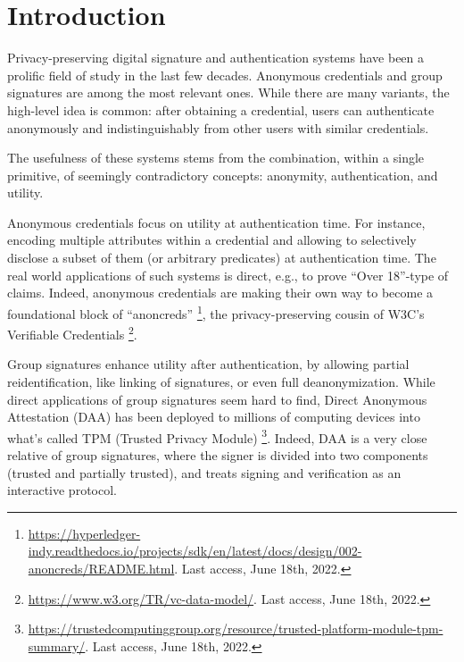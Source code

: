 \section{Introduction}
\label{sec:introduction}


Privacy-preserving digital signature and authentication systems have been a
prolific field of study in the last few decades. Anonymous credentials
\cite{chau85} and group signatures \cite{ch91} are among the most relevant ones.
While there are many variants, the high-level idea is common: after obtaining a
credential, users can authenticate anonymously and indistinguishably from other
users with similar credentials. 

The usefulness of these systems stems from the combination, within a single
primitive, of seemingly contradictory concepts: anonymity, authentication, and
utility.

Anonymous credentials focus on utility at authentication time. For
instance, encoding multiple attributes within a credential and allowing to
selectively disclose a subset of them (or arbitrary predicates) at
authentication time. The real world applications of such systems is direct,
e.g., to prove ``Over 18''-type of claims. Indeed, anonymous credentials are
making their own way to become a foundational block of ``anoncreds''%
\footnote{\url{https://hyperledger-indy.readthedocs.io/projects/sdk/en/latest/docs/design/002-anoncreds/README.html}. Last access, June 18th, 2022.},
the privacy-preserving cousin of W3C's Verifiable Credentials%
\footnote{\url{https://www.w3.org/TR/vc-data-model/}. Last access, June 18th,
  2022.}.

Group signatures enhance utility after authentication, by allowing partial
reidentification, like linking of signatures, or even full deanonymization.
While direct applications of group signatures seem hard to find, Direct
Anonymous Attestation (DAA) \cite{bcc04,bl07,cdl16b} has been deployed to
millions of computing devices into what's called TPM (Trusted Privacy Module)%
\footnote{\url{https://trustedcomputinggroup.org/resource/trusted-platform-module-tpm-summary/}. Last access, June 18th, 2022.}.
Indeed, DAA is a very close relative of group signatures, where the signer is
divided into two components (trusted and partially trusted), and treats signing
and verification as an interactive protocol.










